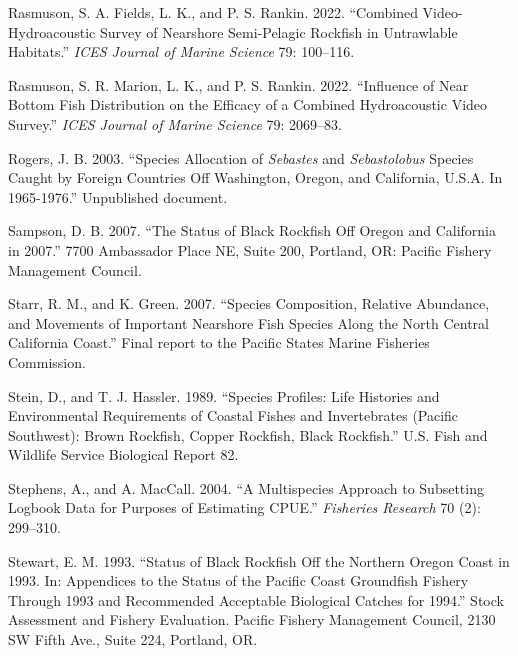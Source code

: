 \documentclass[11pt,
  english,
  letterpaper,
]{article}
\newlength{\cslhangindent}
\newenvironment{CSLReferences}[2] %
 {%
  \setlength{\parindent}{0pt}
  \ifodd #1 \everypar{\setlength{\hangindent}{\cslhangindent}}\ignorespaces\fi
  \ifnum #2 > 0
  \setlength{\parskip}{#2\baselineskip}
  \fi
 }%
 {}
\begin{document}
\begin{CSLReferences}{1}{0}
\leavevmode{}%
Rasmuson, S. A. Fields, L. K., and P. S. Rankin. 2022. {``Combined Video-Hydroacoustic Survey of Nearshore Semi-Pelagic Rockfish in Untrawlable Habitats.''} \emph{{ICES} Journal of Marine Science} 79: 100--116.

\leavevmode{}%
Rasmuson, S. R. Marion, L. K., and P. S. Rankin. 2022. {``Influence of Near Bottom Fish Distribution on the Efficacy of a Combined Hydroacoustic Video Survey.''} \emph{{ICES} Journal of Marine Science} 79: 2069--83.

\leavevmode{}%
Rogers, J. B. 2003. {``Species Allocation of \emph{{Sebastes}} and \emph{Sebastolobus} Species Caught by Foreign Countries Off {Washington}, {Oregon}, and {California}, {U}.{S}.{A}. In 1965-1976.''} Unpublished document.

\leavevmode{}%
Sampson, D. B. 2007. {``The Status of Black Rockfish Off Oregon and California in 2007.''} 7700 Ambassador Place NE, Suite 200, Portland, OR: Pacific Fishery Management Council.

\leavevmode{}%
Starr, R. M., and K. Green. 2007. {``Species Composition, Relative Abundance, and Movements of Important Nearshore Fish Species Along the North Central California Coast.''} Final report to the Pacific States Marine Fisheries Commission.

\leavevmode{}%
Stein, D., and T. J. Hassler. 1989. {``Species Profiles: Life Histories and Environmental Requirements of Coastal Fishes and Invertebrates (Pacific Southwest): Brown Rockfish, Copper Rockfish, Black Rockfish.''} U.S. Fish and Wildlife Service Biological Report 82.

\leavevmode{}%
Stephens, A., and A. MacCall. 2004. {``A Multispecies Approach to Subsetting Logbook Data for Purposes of Estimating {CPUE}.''} \emph{Fisheries Research} 70 (2): 299--310.

\leavevmode{}%
Stewart, E. M. 1993. {``Status of Black Rockfish Off the Northern Oregon Coast in 1993. In: Appendices to the Status of the Pacific Coast Groundfish Fishery Through 1993 and Recommended Acceptable Biological Catches for 1994.''} Stock Assessment and Fishery Evaluation. Pacific Fishery Management Council, 2130 SW Fifth Ave., Suite 224, Portland, OR.


\end{CSLReferences}
\end{document}
